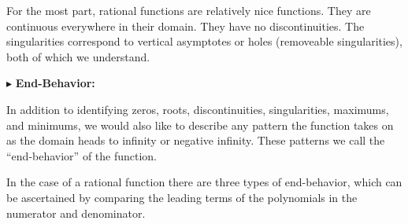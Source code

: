 \documentclass{ximera}
\begin{document}
For the most part, rational functions are relatively nice functions.  They are continuous everywhere in their domain.  They have no discontinuities.  The singularities correspond to vertical asymptotes or holes (removeable singularities), both of which we understand.  










$\blacktriangleright$ \textbf{\textcolor{red!10!blue!90!}{End-Behavior:}} 

In addition to identifying zeros, roots, discontinuities, singularities, maximums, and minimums, we would also like to describe any pattern the function takes on as the domain heads to infinity or negative infinity.  These patterns we call the ``end-behavior'' of the function.  

In the case of a rational function there are three types of end-behavior, which can be ascertained by comparing the leading terms of the polynomials in the numerator and denominator.
\end{document}
